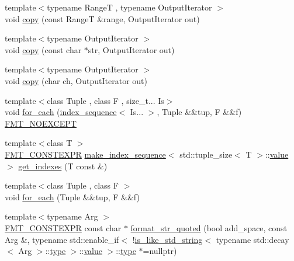 \begin{DoxyCompactItemize}
\item 
{\footnotesize template$<$typename RangeT , typename Output\+Iterator $>$ }\\void \hyperlink{namespaceinternal_a03b2086b2426ff3ecfce2d6fd22b66dc}{copy} (const RangeT \&range, Output\+Iterator out)
\item 
{\footnotesize template$<$typename Output\+Iterator $>$ }\\void \hyperlink{namespaceinternal_ae7d6dd5299686c1c18bb12d34b574362}{copy} (const char $\ast$str, Output\+Iterator out)
\item 
{\footnotesize template$<$typename Output\+Iterator $>$ }\\void \hyperlink{namespaceinternal_a3d05e3346c821a5dc90f1ea85ca6125e}{copy} (char ch, Output\+Iterator out)
\item 
{\footnotesize template$<$class Tuple , class F , size\+\_\+t... Is$>$ }\\void \hyperlink{namespaceinternal_a135f5624f6539777a653836901ec2e9a}{for\+\_\+each} (\hyperlink{namespaceinternal_a934b7952794e1164012436fcd82abb6b}{index\+\_\+sequence}$<$ Is... $>$, Tuple \&\&tup, F \&\&f) \hyperlink{core_8h_aef128913e8400683b1cbd1a3a2e11df3}{F\+M\+T\+\_\+\+N\+O\+E\+X\+C\+E\+PT}
\item 
{\footnotesize template$<$class T $>$ }\\\hyperlink{core_8h_a69201cb276383873487bf68b4ef8b4cd}{F\+M\+T\+\_\+\+C\+O\+N\+S\+T\+E\+X\+PR} \hyperlink{namespaceinternal_ac3a4f2187fce6a6dfd5576bd311c9876}{make\+\_\+index\+\_\+sequence}$<$ std\+::tuple\+\_\+size$<$ T $>$\+::\hyperlink{classinternal_1_1value}{value} $>$ \hyperlink{namespaceinternal_aa8f32827bf5cced22ea13872d6058762}{get\+\_\+indexes} (T const \&)
\item 
{\footnotesize template$<$class Tuple , class F $>$ }\\void \hyperlink{namespaceinternal_ad176bd254de2376b5b51d2aa8fbffed6}{for\+\_\+each} (Tuple \&\&tup, F \&\&f)
\item 
{\footnotesize template$<$typename Arg $>$ }\\\hyperlink{core_8h_a69201cb276383873487bf68b4ef8b4cd}{F\+M\+T\+\_\+\+C\+O\+N\+S\+T\+E\+X\+PR} const char $\ast$ \hyperlink{namespaceinternal_ae4a81ecefd309d3f64e05535ed306514}{format\+\_\+str\+\_\+quoted} (bool add\+\_\+space, const Arg \&, typename std\+::enable\+\_\+if$<$ !\hyperlink{classinternal_1_1is__like__std__string}{is\+\_\+like\+\_\+std\+\_\+string}$<$ typename std\+::decay$<$ Arg $>$\+::\hyperlink{namespaceinternal_a8661864098ac0acff9a6dd7e66f59038}{type} $>$\+::\hyperlink{classinternal_1_1value}{value} $>$\+::\hyperlink{namespaceinternal_a8661864098ac0acff9a6dd7e66f59038}{type} $\ast$=nullptr)

\end{DoxyCompactItemize}
